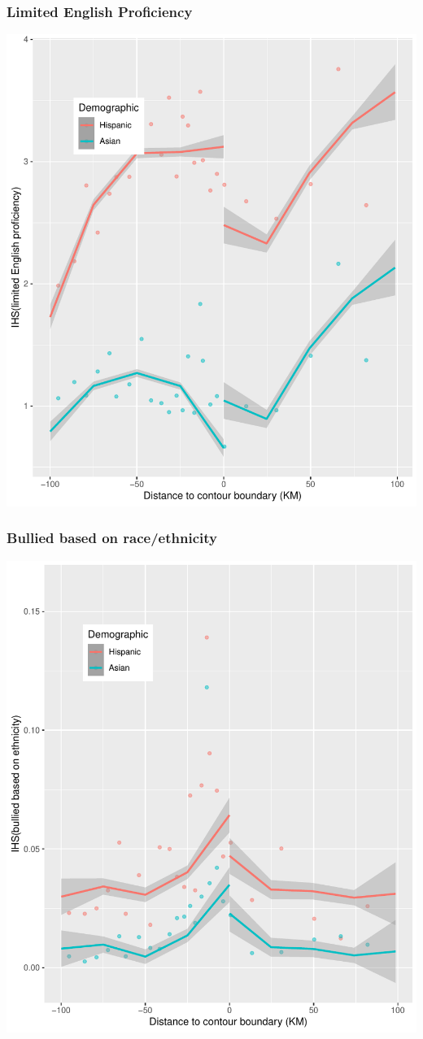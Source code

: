 \documentclass{beamer}
\begin{document}
\begin{frame}
\frametitle{Limited English Proficiency}
\begin{center}
\includegraphics[width=.6\textwidth]{../../analysis/Output/graphs/lepenr.pdf} 
\end{center}
\end{frame}

\begin{frame}
\frametitle{Bullied based on race/ethnicity}
\begin{center}
\includegraphics[width=.6\textwidth]{../../analysis/Output/graphs/hbreported.pdf} 
\end{center}
\end{frame}
\end{document}
